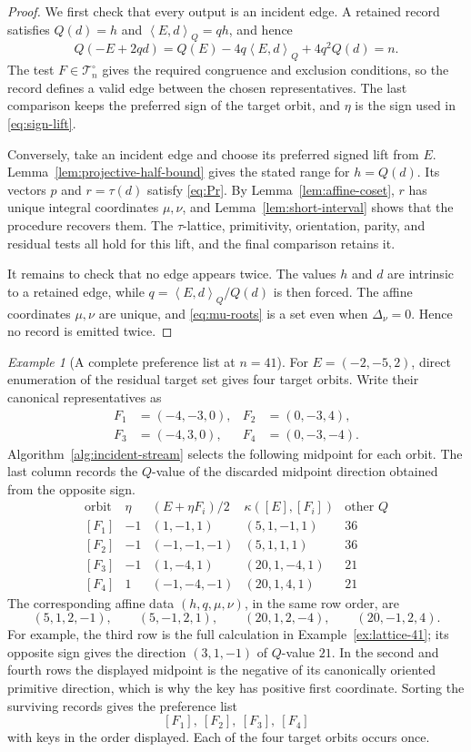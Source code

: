 \documentclass[11pt]{amsart}
\theoremstyle{definition}
\theoremstyle{remark}
\newtheorem{example}[theorem]{Example}
\newcommand{\Tres}{\mathcal T_n^{\circ}}
\newcommand{\Qip}[2]{\left\langle #1,#2\right\rangle_Q}
\begin{document}
\begin{proof}
We first check that every output is an incident edge.  A retained record
satisfies $Q(d)=h$ and $\Qip{E}{d}=qh$, and hence
\[
 Q(-E+2qd)=Q(E)-4q\Qip{E}{d}+4q^2Q(d)=n.
\]
The test $F\in\Tres$ gives the required congruence and exclusion conditions,
so the record defines a valid edge between the chosen representatives.  The
last comparison keeps the preferred sign of the target orbit, and $\eta$ is
the sign used in \eqref{eq:sign-lift}.

Conversely, take an incident edge and choose its preferred signed lift from $E$.
Lemma~\ref{lem:projective-half-bound} gives the stated range for
$h=Q(d)$.  Its vectors $p$ and $r=\tau(d)$ satisfy \eqref{eq:Pr}.  By
Lemma~\ref{lem:affine-coset}, $r$ has unique integral coordinates $\mu,\nu$, and
Lemma~\ref{lem:short-interval} shows that the procedure recovers them.  The
$\tau$-lattice, primitivity, orientation, parity, and residual tests all hold
for this lift, and the final comparison retains it.

It remains to check that no edge appears twice.  The values $h$ and $d$ are
intrinsic to a retained edge, while
$q=\Qip{E}{d}/Q(d)$ is then forced.  The affine coordinates $\mu,\nu$ are
unique, and \eqref{eq:mu-roots} is a set even when $\Delta_\nu=0$.  Hence no
record is emitted twice.
\end{proof}

\begin{example}[A complete preference list at $n=41$]
\label{ex:complete-row-41}
For $E=(-2,-5,2)$, direct enumeration of the residual target set gives four
target orbits.  Write their canonical representatives as
\[
\begin{aligned}
 F_1&=(-4,-3,0),&F_2&=(0,-3,4),\\
 F_3&=(-4,3,0), &F_4&=(0,-3,-4).
\end{aligned}
\]
Algorithm~\ref{alg:incident-stream} selects the following midpoint for each
orbit.  The last column records the $Q$-value of the
discarded midpoint direction obtained from the opposite sign.
\[
\begin{array}{c|c|c|c|c}
\text{orbit}&\eta&(E+\eta F_i)/2&\kappa([E],[F_i])&\text{other }Q\\ \hline
{[F_1]}&-1&(1,-1,1)&(5,1,-1,1)&36\\
{[F_2]}&-1&(-1,-1,-1)&(5,1,1,1)&36\\
{[F_3]}&-1&(1,-4,1)&(20,1,-4,1)&21\\
{[F_4]}& 1&(-1,-4,-1)&(20,1,4,1)&21
\end{array}
\]
The corresponding affine data $(h,q,\mu,\nu)$, in the same row order, are
\[
 (5,1,2,-1),\qquad
 (5,-1,2,1),\qquad
 (20,1,2,-4),\qquad
 (20,-1,2,4).
\]
For example, the third row is the full calculation in
Example~\ref{ex:lattice-41}; its opposite sign gives the direction
$(3,1,-1)$ of $Q$-value $21$.  In the second and fourth rows the displayed
midpoint is the negative of its canonically oriented primitive direction,
which is why the key has positive first coordinate.  Sorting the surviving
records gives the preference list
\[
 [F_1],\ [F_2],\ [F_3],\ [F_4]
\]
with keys in the order displayed.  Each of the four target orbits occurs
once.
\end{example}
\end{document}
